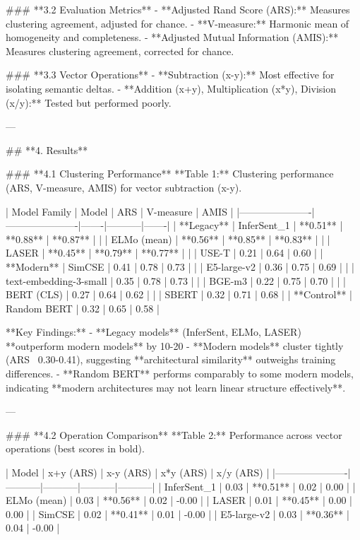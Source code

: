 ### **3.2 Evaluation Metrics**
- **Adjusted Rand Score (ARS):** Measures clustering agreement, adjusted for chance.
- **V-measure:** Harmonic mean of homogeneity and completeness.
- **Adjusted Mutual Information (AMIS):** Measures clustering agreement, corrected for chance.

### **3.3 Vector Operations**
- **Subtraction (x-y):** Most effective for isolating semantic deltas.
- **Addition (x+y), Multiplication (x*y), Division (x/y):** Tested but performed poorly.

---

## **4. Results**

### **4.1 Clustering Performance**
**Table 1:** Clustering performance (ARS, V-measure, AMIS) for vector subtraction (x-y).

| Model Family         | Model               | ARS   | V-measure | AMIS  |
|----------------------|----------------------|-------|-----------|-------|
| **Legacy**           | InferSent\_1         | **0.51** | **0.88**   | **0.87** |
|                      | ELMo (mean)          | **0.56** | **0.85**   | **0.83** |
|                      | LASER                | **0.45** | **0.79**   | **0.77** |
|                      | USE-T                | 0.21   | 0.64      | 0.60   |
| **Modern**           | SimCSE               | 0.41   | 0.78      | 0.73   |
|                      | E5-large-v2          | 0.36   | 0.75      | 0.69   |
|                      | text-embedding-3-small | 0.35   | 0.78      | 0.73   |
|                      | BGE-m3               | 0.22   | 0.75      | 0.70   |
|                      | BERT (CLS)           | 0.27   | 0.64      | 0.62   |
|                      | SBERT                | 0.32   | 0.71      | 0.68   |
| **Control**          | Random BERT          | 0.32   | 0.65      | 0.58   |

**Key Findings:**
- **Legacy models** (InferSent, ELMo, LASER) **outperform modern models** by 10-20%
- **Modern models** cluster tightly (ARS ~0.30-0.41), suggesting **architectural similarity** outweighs training differences.
- **Random BERT** performs comparably to some modern models, indicating **modern architectures may not learn linear structure effectively**.

---

### **4.2 Operation Comparison**
**Table 2:** Performance across vector operations (best scores in bold).

| Model               | x+y (ARS) | x-y (ARS) | x*y (ARS) | x/y (ARS) |
|----------------------|-----------|-----------|-----------|-----------|
| InferSent\_1         | 0.03      | **0.51**  | 0.02      | 0.00      |
| ELMo (mean)          | 0.03      | **0.56**  | 0.02      | -0.00     |
| LASER                | 0.01      | **0.45**  | 0.00      | 0.00      |
| SimCSE               | 0.02      | **0.41**  | 0.01      | -0.00     |
| E5-large-v2          | 0.03      | **0.36**  | 0.04      | -0.00     |


